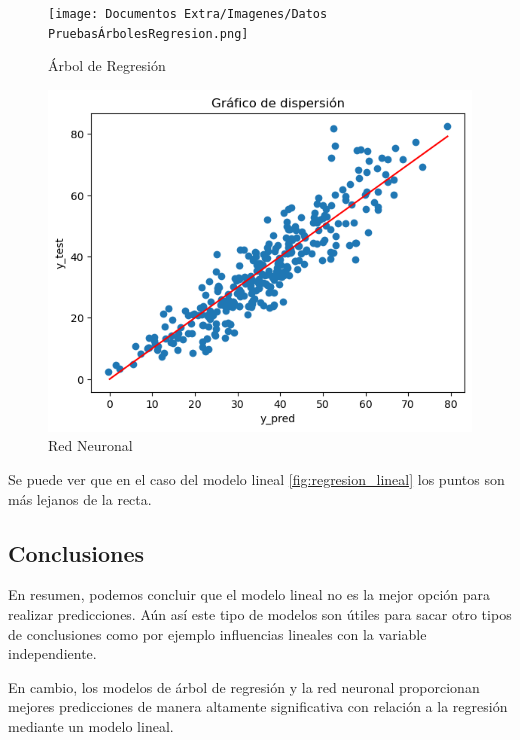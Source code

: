 \begin{figure}[ht]
\begin{minipage}{0.32\textwidth}
    \texttt{[image: Documentos Extra/Imagenes/Datos PruebasÁrbolesRegresion.png]}
    \caption{Árbol de Regresión}
    \label{fig:regression_tree}
  \end{minipage}
  \begin{minipage}{0.32\textwidth}
    \includegraphics[width=\textwidth]{Documentos Extra/Imagenes/Datos PruebasRedNeuronal.png}
    \caption{Red Neuronal}
    \label{fig:red_neuronal}
  \end{minipage}
 \end{figure}

\noindent Se puede ver que en el caso del modelo lineal \ref{fig:regresion_lineal} los puntos son más lejanos de la recta. 




\subsection*{Conclusiones}
\noindent En resumen, podemos concluir que el modelo lineal no es la mejor opción para realizar predicciones. Aún así este tipo de modelos son útiles para sacar otro tipos de conclusiones como por ejemplo influencias lineales con la variable independiente. 

\noindent En cambio, los modelos de árbol de regresión y la red neuronal proporcionan mejores predicciones de manera altamente significativa con relación a la regresión mediante un modelo lineal.